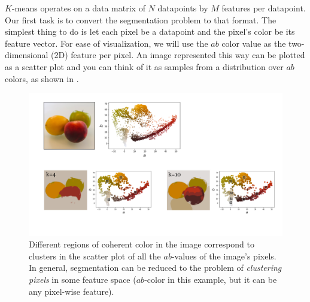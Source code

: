 $K$-means operates on a data matrix of $N$ datapoints by $M$ features per datapoint. Our first task is to convert the segmentation problem to that format. The simplest thing to do is let each pixel be a datapoint and the pixel's color be its feature vector. For ease of visualization, we will use the $ab$ color value as the two-dimensional (2D) feature per pixel. An image represented this way can be plotted as a scatter plot and you can think of it as samples from a distribution over $ab$ colors, as shown in \fig{\ref{fig:perceptual_organization:scatter_ab_fruits2}}.
\vspace{-0.4cm}
\begin{figure}[h!]
    \centerline{
    \includegraphics[width=0.75\linewidth]{./figures/perceptual_organization/scatter_ab_fruits2.pdf}
    }
    \caption{Different regions of coherent color in the image correspond to clusters in the scatter plot of all the $ab$-values of the image's pixels. In general, segmentation can be reduced to the problem of \textit{clustering pixels} in some feature space ($ab$-color in this example, but it can be any pixel-wise feature).}
    \label{fig:perceptual_organization:scatter_ab_fruits2}
\end{figure}
\vspace{-0.4cm}


